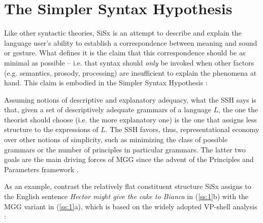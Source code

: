 \documentclass[output=paper,hidelinks]{langscibook}
\begin{document}


\section{The Simpler Syntax Hypothesis}\label{ss:sec1}

Like other syntactic theories, SiSx  is an attempt to describe and explain the language user’s ability to establish a correspondence between meaning and sound or gesture. What defines it is the claim that this correspondence should be as minimal as possible -- i.e. that syntax should \textit{only} be invoked when other factors  (e.g. semantics, prosody, processing) are insufficient to explain the phenomena at hand. This claim is embodied in the Simpler Syntax Hypothesis \citep[5]{culicover2005simpler}:


\begin{exe}
\label{ss:ssh}
\end{exe}

Assuming  notions of descriptive and explanatory adequacy, what the SSH says is that, given a set of descriptively adequate grammars of a language $L$, the one the theorist should choose (i.e.  the more explanatory one) is the one that assigns less structure to the expressions of $L$. The SSH favors, thus, representational economy \citep{chomsky1991some, trotzke2014complexity} over other notions of simplicity, such as minimizing the class of possible grammars or the number of principles in particular grammars. The latter two goals are the main driving forces of MGG since the advent of the Principles and Parameters framework \citep{chomsky1973conditions, chomsky1981lectures, chomsky1995the-minimalist}. 


\largerpage[2]
As an example, contrast the relatively flat constituent structure SiSx assigns to the English sentence \textit{Hector might give the cake to Bianca} in (\ref{ss:1}b) with the MGG variant in (\ref{ss:1}a), which is based on the widely adopted VP-shell analysis \citep{larson1988double, kratzer1996severing, hale1993on-argument, chomsky1995the-minimalist}:
\newpage
\end{document}
